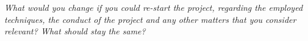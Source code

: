 \emph{What would you change if you could re-start the project, regarding the employed techniques, the conduct of the project and any other matters that you consider relevant?  What should stay the same?}